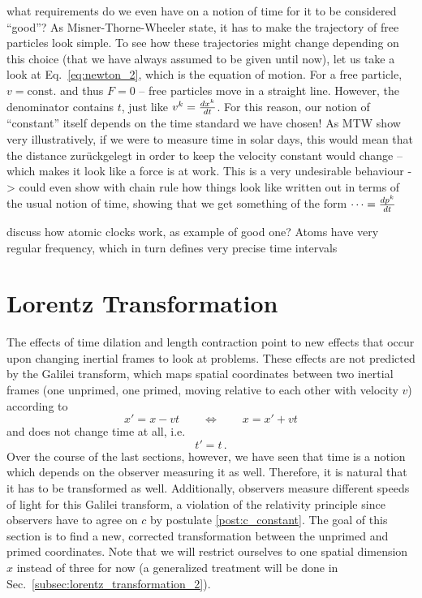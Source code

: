 \documentclass[../relativity_main.tex]{subfiles}
\begin{document}
what requirements do we even have on a notion of time for it to be considered \enquote{good}? As Misner-Thorne-Wheeler state, it has to make the trajectory of free particles look simple. To see how these trajectories might change depending on this choice (that we have always assumed to be given until now), let us take a look at Eq.~\eqref{eq:newton_2}, which is the equation of motion. For a free particle, $v = \text{const.}$ and thus $F = 0$ -- free particles move in a straight line. However, the denominator contains $t$, just like $v^k = \dv{x^k}{t}$. For this reason, our notion of \enquote{constant} itself depends on the time standard we have chosen! As MTW show very illustratively, if we were to measure time in solar days, this would mean that the distance zurückgelegt in order to keep the velocity constant would change -- which makes it look like a force is at work. This is a very undesirable behaviour -> could even show with chain rule how things look like written out in terms of the usual notion of time, showing that we get something of the form $\dots = \dv{p^k}{t}$


discuss how atomic clocks work, as example of good one? Atoms have very regular frequency, which in turn defines very precise time intervals



\newpage



	\section{Lorentz Transformation}\label{sec:lorentz_transformation_1}
The effects of time dilation and length contraction point to new effects that occur upon changing inertial frames to look at problems. These effects are not predicted by the Galilei transform, which maps spatial coordinates between two inertial frames (one unprimed, one primed, moving relative to each other with velocity $v$) according to 
\begin{equation*}
	x' = x - v t
	\qquad \Leftrightarrow \qquad
	x = x' + v t
\end{equation*}
and does not change time at all, i.e.
\begin{equation*}
	t' = t \, .
\end{equation*}
Over the course of the last sections, however, we have seen that time is a notion which depends on the observer measuring it as well. Therefore, it is natural that it has to be transformed as well. Additionally, observers measure different speeds of light for this Galilei transform, a violation of the relativity principle since observers have to agree on $c$ by postulate \ref{post:c_constant}. The goal of this section is to find a new, corrected transformation between the unprimed and primed coordinates. Note that we will restrict ourselves to one spatial dimension $x$ instead of three for now (a generalized treatment will be done in Sec.~\ref{subsec:lorentz_transformation_2}).\\
\end{document}
